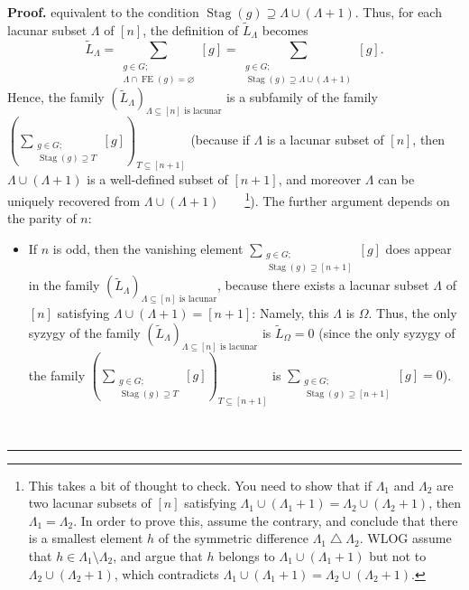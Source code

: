 \documentclass[numbers=enddot,12pt,final,onecolumn,notitlepage]{scrartcl}%
\theoremstyle{definition}
\newenvironment{proof}[1][Proof]{\noindent\textbf{#1.} }{\ \rule{0.5em}{0.5em}}
\let\sumnonlimits\sum
\renewcommand{\sum}{\sumnonlimits\limits}
\begin{document}
\begin{proof}
equivalent to the condition $\operatorname*{Stag}\left(  g\right)
\supseteq\Lambda\cup\left(  \Lambda+1\right)  $. Thus, for each lacunar subset
$\Lambda$ of $\left[  n\right]  $, the definition of $\widetilde{L}_{\Lambda}$
becomes%
\[
\widetilde{L}_{\Lambda}=\sum_{\substack{g\in G;\\\Lambda\cap\operatorname*{FE}%
\left(  g\right)  =\varnothing}}\left[  g\right]  =\sum_{\substack{g\in
G;\\\operatorname*{Stag}\left(  g\right)  \supseteq\Lambda\cup\left(
\Lambda+1\right)  }}\left[  g\right]  .
\]
Hence, the family $\left(  \widetilde{L}_{\Lambda}\right)  _{\Lambda
\subseteq\left[  n\right]  \text{ is lacunar}}$ is a subfamily of the family
$\left(  \sum_{\substack{g\in G;\\\operatorname*{Stag}\left(  g\right)
\supseteq T}}\left[  g\right]  \right)  _{T\subseteq\left[  n+1\right]  }$
(because if $\Lambda$ is a lacunar subset of $\left[  n\right]  $, then
$\Lambda\cup\left(  \Lambda+1\right)  $ is a well-defined subset of $\left[
n+1\right]  $, and moreover $\Lambda$ can be uniquely recovered from
$\Lambda\cup\left(  \Lambda+1\right)  $\ \ \ \ \footnote{This takes a bit of
thought to check. You need to show that if $\Lambda_{1}$ and $\Lambda_{2}$ are
two lacunar subsets of $\left[  n\right]  $ satisfying $\Lambda_{1}\cup\left(
\Lambda_{1}+1\right)  =\Lambda_{2}\cup\left(  \Lambda_{2}+1\right)  $, then
$\Lambda_{1}=\Lambda_{2}$. In order to prove this, assume the contrary, and
conclude that there is a smallest element $h$ of the symmetric difference
$\Lambda_{1}\bigtriangleup\Lambda_{2}$. WLOG assume that $h\in\Lambda
_{1}\setminus\Lambda_{2}$, and argue that $h$ belongs to $\Lambda_{1}%
\cup\left(  \Lambda_{1}+1\right)  $ but not to $\Lambda_{2}\cup\left(
\Lambda_{2}+1\right)  $, which contradicts $\Lambda_{1}\cup\left(  \Lambda
_{1}+1\right)  =\Lambda_{2}\cup\left(  \Lambda_{2}+1\right)  $.}). The further
argument depends on the parity of $n$:

\begin{itemize}
\item If $n$ is odd, then the vanishing element $\sum_{\substack{g\in
G;\\\operatorname*{Stag}\left(  g\right)  \supseteq\left[  n+1\right]
}}\left[  g\right]  $ does appear in the family $\left(  \widetilde{L}%
_{\Lambda}\right)  _{\Lambda\subseteq\left[  n\right]  \text{ is lacunar}}$,
because there exists a lacunar subset $\Lambda$ of $\left[  n\right]  $
satisfying $\Lambda\cup\left(  \Lambda+1\right)  =\left[  n+1\right]  $:
Namely, this $\Lambda$ is $\Omega$. Thus, the only syzygy of the family
$\left(  \widetilde{L}_{\Lambda}\right)  _{\Lambda\subseteq\left[  n\right]
\text{ is lacunar}}$ is $\widetilde{L}_{\Omega}=0$ (since the only syzygy of
the family $\left(  \sum_{\substack{g\in G;\\\operatorname*{Stag}\left(
g\right)  \supseteq T}}\left[  g\right]  \right)  _{T\subseteq\left[
n+1\right]  }$ is $\sum_{\substack{g\in G;\\\operatorname*{Stag}\left(
g\right)  \supseteq\left[  n+1\right]  }}\left[  g\right]  =0$).


\end{itemize}
\end{proof}
\end{document}
